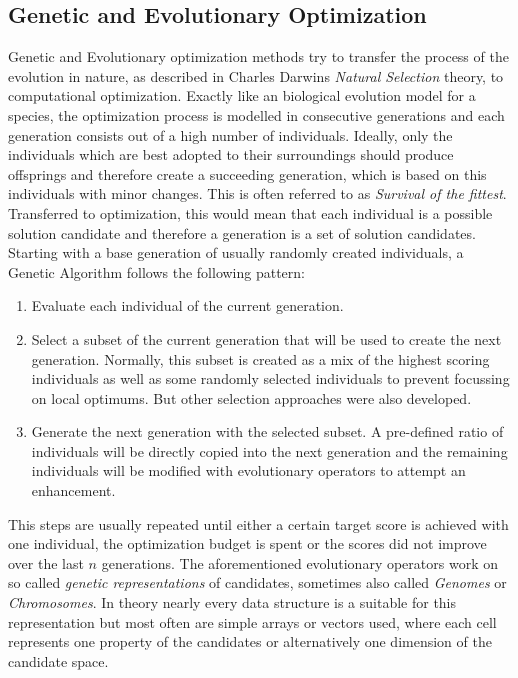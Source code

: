 \subsection{Genetic and Evolutionary Optimization}
\label{sec:theory:optimization:genetic}
Genetic and Evolutionary optimization methods try to transfer the process of the evolution in nature, as described in Charles Darwins \textit{Natural Selection} theory, to computational optimization.
Exactly like an biological evolution model for a species, the optimization process is modelled in consecutive generations and each generation consists out of a high number of individuals.
Ideally, only the individuals which are best adopted to their surroundings should produce offsprings and therefore create a succeeding generation, which is based on this individuals with minor changes.
This is often referred to as \textit{Survival of the fittest}.
Transferred to optimization, this would mean that each individual is a possible solution candidate and therefore a generation is a set of solution candidates.
Starting with a base generation of usually randomly created individuals, a Genetic Algorithm follows the following pattern:
\begin{enumerate}
    \item Evaluate each individual of the current generation.
    \item Select a subset of the current generation that will be used to create the next generation. Normally, this subset is created as a mix of the highest scoring individuals as well as some randomly selected individuals to prevent focussing on local optimums. But other selection approaches were also developed.
    \item Generate the next generation with the selected subset. A pre-defined ratio of individuals will be directly copied into the next generation and the remaining individuals will be modified with evolutionary operators to attempt an enhancement.
\end{enumerate}
This steps are usually repeated until either a certain target score is achieved with one individual, the optimization budget is spent or the scores did not improve over the last $n$ generations.\newline
The aforementioned evolutionary operators work on so called \textit{genetic representations} of candidates, sometimes also called \textit{Genomes} or \textit{Chromosomes}.
In theory nearly every data structure is a suitable for this representation but most often are simple arrays or vectors used, where each cell represents one property of the candidates or alternatively one dimension of the candidate space.
